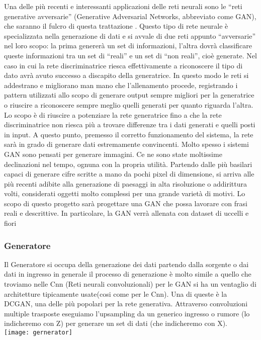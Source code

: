 Una delle più recenti  e interessanti  applicazioni delle reti neurali sono le “reti generative avversarie” (Generative Adversarial Networks, abbreviato come GAN), che saranno il fulcro di questa trattazione . Questo tipo di rete neurale è specializzata nella generazione di dati e si avvale di due reti appunto “avversarie” nel loro scopo: la prima genererà un set di informazioni, l’altra dovrà classificare queste informazioni tra un set di “reali” e un set di “non reali”, cioè generate. Nel caso in cui la rete discriminatrice riesca effettivamente a riconoscere il tipo di dato avrà avuto successo a discapito della generatrice. In questo modo le reti si addestrano e migliorano  man mano che l’allenamento procede, registrando i pattern utilizzati allo scopo di generare output sempre migliori per la generatrice o riuscire a riconoscere sempre meglio quelli generati per quanto riguarda l’altra. Lo scopo è di riuscire a potenziare la rete generatrice fino a che la rete discriminatrice non riesca più a trovare differenze tra i dati generati e quelli posti in input. A questo punto, premesso il corretto funzionamento del sistema, la rete sarà in grado di generare dati estremamente convincenti.
Molto spesso i sistemi GAN sono pensati per generare immagini. Ce ne sono state moltissime declinazioni nel tempo, ognuna con la propria utilità. Partendo dalle più basilari capaci di generare cifre scritte a mano da pochi pixel di dimensione, si arriva alle più recenti adibite alla generazione di paesaggi in alta risoluzione o addirittura volti, considerati oggetti molto complessi per una grande varietà di motivi.
Lo scopo di questo progetto sarà progettare una GAN che possa lavorare con frasi reali e descrittive. In particolare, la GAN verrà allenata con dataset di uccelli e fiori 




\subsubsection{Generatore }
Il Generatore si occupa della generazione dei dati partendo dalla sorgente o dai dati in ingresso  in generale il processo di generazione è molto simile a quello che troviamo nelle Cnn (Reti neurali convoluzionali) per le GAN si ha  un ventaglio di architetture tipicamente usate(cosi come  per le Cnn). Una di queste è la DCGAN, una delle più popolari per la rete generativa.
Attraverso convoluzioni multiple trasposte eseguiamo l’upsampling da un generico ingresso o rumore (lo indicheremo con Z)  per generare un set di dati (che indicheremo con  X).\\
\texttt{[image: gernerator]}


